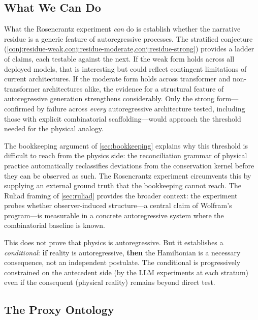 \documentclass[12pt,a4paper]{article}
\theoremstyle{definition}
\theoremstyle{remark}
\begin{document}
\subsection{What We Can Do}

What the Rosencrantz experiment \emph{can} do is establish whether
the narrative residue is a generic feature of autoregressive
processes.  The stratified conjecture
(\cref{conj:residue-weak,conj:residue-moderate,conj:residue-strong})
provides a ladder of claims, each testable against the next.  If
the weak form holds across all deployed models, that is interesting
but could reflect contingent limitations of current architectures.
If the moderate form holds across transformer and non-transformer
architectures alike, the evidence for a structural feature of
autoregressive generation strengthens considerably.  Only the strong
form---confirmed by failure across \emph{every} autoregressive
architecture tested, including those with explicit combinatorial
scaffolding---would approach the threshold needed for the physical
analogy.

The bookkeeping argument of \cref{sec:bookkeeping} explains why
this threshold is difficult to reach from the physics side: the
reconciliation grammar of physical practice automatically
reclassifies deviations from the conservation kernel before they
can be observed as such.  The Rosencrantz experiment circumvents
this by supplying an external ground truth that the bookkeeping
cannot reach.  The Ruliad framing of \cref{sec:ruliad} provides
the broader context: the experiment probes whether observer-induced
structure---a central claim of Wolfram's program---is measurable in
a concrete autoregressive system where the combinatorial baseline
is known.

This does not prove that physics is autoregressive.  But it
establishes a \emph{conditional}: \textbf{if} reality is
autoregressive, \textbf{then} the Hamiltonian is a necessary
consequence, not an independent postulate.  The conditional is
progressively constrained on the antecedent side (by the LLM
experiments at each stratum) even if the consequent (physical
reality) remains beyond direct test.

\subsection{The Proxy Ontology}
\end{document}
